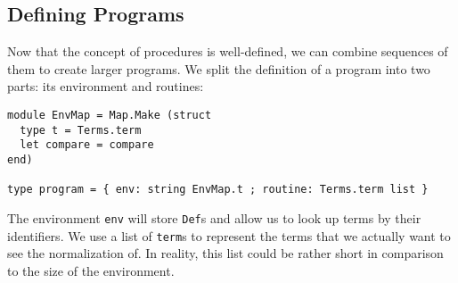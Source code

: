\documentclass[12pt,letterpaper]{article}
\begin{document}
\subsection{Defining Programs}
Now that the concept of procedures is well-defined, we can combine sequences of them to create larger programs.
We split the definition of a program into two parts: its environment and routines:

\begin{verbatim}
module EnvMap = Map.Make (struct
  type t = Terms.term
  let compare = compare
end)

type program = { env: string EnvMap.t ; routine: Terms.term list }
\end{verbatim}
The environment \texttt{env} will store \texttt{Def}s and allow us to look up terms by their identifiers.
We use a list of \texttt{term}s to represent the terms that we actually want to see the normalization of.
In reality, this list could be rather short in comparison to the size of the environment.
\end{document}
